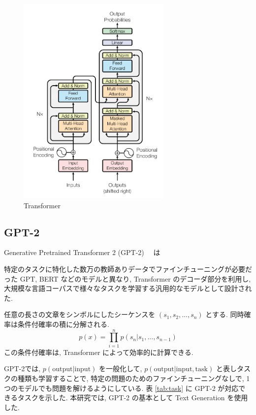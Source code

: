 \documentclass[twocolumn]{jarticle}     %
\begin{document}
\begin{figure}[tb]
  \begin{center}
    \includegraphics[clip,width=75mm]{Transformer.png}
    \caption{Transformer}
    \label{fig:trans}
  \end{center}
\end{figure}



\subsection{GPT-2}
Generative Pretrained Transformer 2 (GPT-2) \cite{radford2019language}　は

特定のタスクに特化した数万の教師ありデータでファインチューニングが必要だった GPT, BERT などのモデルと異なり,
Transformer のデコーダ部分を利用し,
大規模な言語コーパスで様々なタスクを学習する汎用的なモデルとして設計された.

任意の長さの文章をシンボルにしたシーケンスを $(s_1, s_2, ..., s_n)$ とする.
同時確率は条件付確率の積に分解される.
\begin{equation}
p(x) = \prod^n_{i=1} p(s_n|s_1, ... , s_{n-1})
\end{equation}
この条件付確率は, Transformer によって効率的に計算できる.

GPT-2では, $p(\mathrm{output} | \mathrm{input})$ を一般化して,
$p(\mathrm{output} | \mathrm{input}, \mathrm{task})$ と表しタスクの種類も学習することで, 特定の問題のためのファインチューニングなしで, 1 つのモデルでも問題を解けるようにしている.
表 \ref{tab:task} に GPT-2 が対応できるタスクを示した.
本研究では, GPT-2 の基本として Text Generation を使用した.
\end{document}
